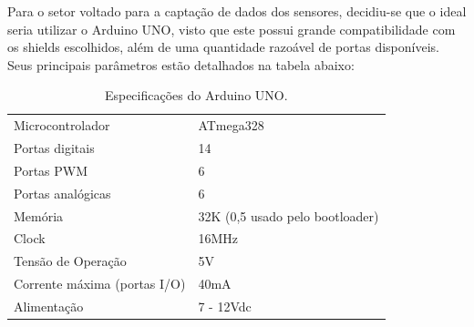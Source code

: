 	Para o setor voltado para a captação de dados dos sensores, decidiu-se que o ideal seria utilizar o Arduino UNO, visto que este possui grande compatibilidade com os shields escolhidos, além de uma quantidade razoável de portas disponíveis. Seus principais parâmetros estão detalhados na tabela abaixo:

	\begin{table}[]
		\centering
		\begin{tabular}{ll}
			Microcontrolador             & ATmega328                       \\
			Portas digitais              & 14                              \\
			Portas PWM                   & 6                               \\
			Portas analógicas            & 6                               \\
			Memória                      & 32K (0,5 usado pelo bootloader) \\
			Clock                        & 16MHz                           \\
			Tensão de Operação           & 5V                              \\
			Corrente máxima (portas I/O) & 40mA                            \\
			Alimentação                  & 7 - 12Vdc
		\end{tabular}
		\caption{Especificações do Arduino UNO.}
		\label{tab:arduino}
	\end{table}
